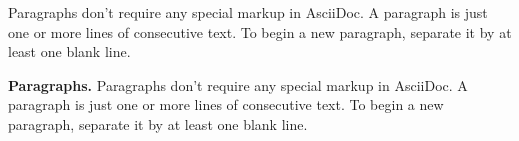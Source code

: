 Paragraphs don’t require any special markup in AsciiDoc.
A paragraph is just one or more lines of consecutive text.
To begin a new paragraph, separate it by at least one blank line.

{\bf Paragraphs.}
Paragraphs don’t require any special markup in AsciiDoc.
A paragraph is just one or more lines of consecutive text.
To begin a new paragraph, separate it by at least one blank line.


